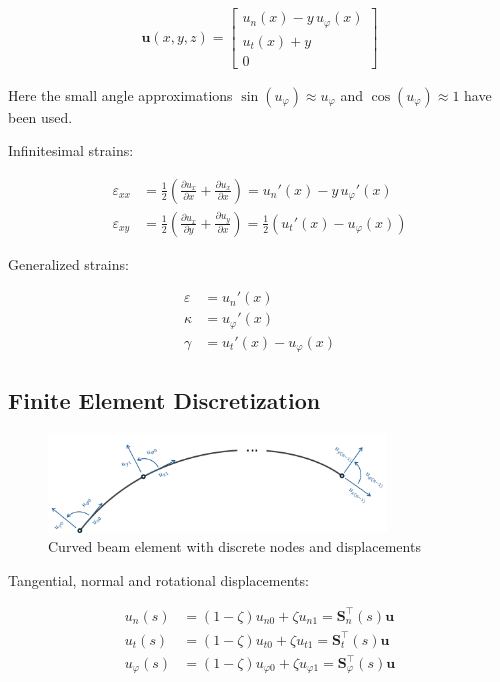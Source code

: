 \begin{align}
\boldsymbol{u}(x,y,z)
=
\begin{bmatrix}
u_n(x) - y\,u_\varphi(x) \\
u_t(x) + y \\
0
\end{bmatrix}
\end{align}

Here the small angle approximations $\sin(u_\varphi) \approx u_\varphi$ and $\cos(u_\varphi) \approx 1$ have been used.

Infinitesimal strains:

\begin{align}
\varepsilon_{xx} &= \frac{1}{2}\left(\frac{\partial u_x}{\partial x} + \frac{\partial u_x}{\partial x}\right) = u_n'(x) - y\,u_\varphi'(x) \\
\varepsilon_{xy} &= \frac{1}{2}\left(\frac{\partial u_x}{\partial y} + \frac{\partial u_y}{\partial x}\right) = \frac{1}{2}\left(u_t'(x) - u_\varphi(x)\right)
\end{align}

Generalized strains:

\begin{align}
\varepsilon &= u_n'(x) \\
\kappa &= u_\varphi'(x) \\
\gamma &= u_t'(x) - u_\varphi(x)
\end{align}

\newpage
\subsection*{Finite Element Discretization}

\begin{figure}[h]
\centering
\includegraphics[width=0.8\textwidth]{figures/elements/linear-curved-beam-nodes.pdf}
\caption{Curved beam element with discrete nodes and displacements}
\label{fig:linear-curved-beam-nodes}
\end{figure}


Tangential, normal and rotational displacements:

\begin{align}
u_n(s) &= (1-\zeta) u_{n0} + \zeta u_{n1} = \boldsymbol{S}^\intercal_n(s) \boldsymbol{u} \\
u_t(s) &= (1-\zeta) u_{t0} + \zeta u_{t1} = \boldsymbol{S}^\intercal_t(s) \boldsymbol{u} \\
u_\varphi(s) &= (1-\zeta) u_{\varphi 0} + \zeta u_{\varphi 1} = \boldsymbol{S}^\intercal_\varphi(s) \boldsymbol{u}
\end{align}

